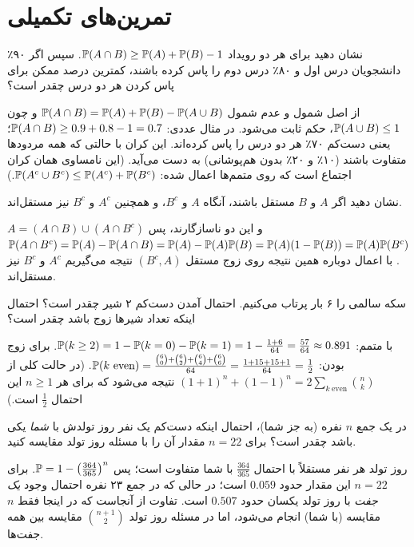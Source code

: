 \section{تمرین‌های تکمیلی}

\begin{exercise}
نشان دهید برای هر دو رویداد $\mathbb{P}(A\cap B)\ge\mathbb{P}(A)+\mathbb{P}(B)-1$. سپس اگر ۹۰٪ دانشجویان درس اول و ۸۰٪ درس دوم را پاس کرده باشند، کمترین درصد ممکن برای پاس کردن هر دو درس چقدر است؟
\end{exercise}
\begin{solution}
از اصل شمول و عدم شمول $\mathbb{P}(A\cap B)=\mathbb{P}(A)+\mathbb{P}(B)-\mathbb{P}(A\cup B)$ و چون $\mathbb{P}(A\cup B)\le1$، حکم ثابت می‌شود. در مثال عددی: $\mathbb{P}(A\cap B)\ge0.9+0.8-1=0.7$؛ یعنی دست‌کم ۷۰٪ هر دو درس را پاس کرده‌اند. این کران با حالتی که همه مردودها متفاوت باشند (۱۰٪ و ۲۰٪ بدون هم‌پوشانی) به دست می‌آید. (این نامساوی همان کران اجتماع است که روی متمم‌ها اعمال شده: $\mathbb{P}(A^c\cup B^c)\le\mathbb{P}(A^c)+\mathbb{P}(B^c)$.)
\end{solution}

\begin{exercise}\label{ex:indep-comp}
نشان دهید اگر $A$ و $B$ مستقل باشند، آنگاه $A$ و $B^c$، و همچنین $A^c$ و $B^c$ نیز مستقل‌اند.
\end{exercise}
\begin{solution}
$A=(A\cap B)\cup(A\cap B^c)$ و این دو ناسازگارند، پس
$\mathbb{P}(A\cap B^c)=\mathbb{P}(A)-\mathbb{P}(A\cap B)=\mathbb{P}(A)-\mathbb{P}(A)\mathbb{P}(B)=\mathbb{P}(A)(1-\mathbb{P}(B))=\mathbb{P}(A)\mathbb{P}(B^c)$.
با اعمال دوباره همین نتیجه روی زوج مستقل $(B^c,A)$ نتیجه می‌گیریم $A^c$ و $B^c$ نیز مستقل‌اند.
\end{solution}

\begin{exercise}
سکه سالمی را ۶ بار پرتاب می‌کنیم. احتمال آمدن دست‌کم ۲ شیر چقدر است؟ احتمال اینکه تعداد شیرها زوج باشد چقدر است؟
\end{exercise}
\begin{solution}
با متمم: $\mathbb{P}(k\ge2)=1-\mathbb{P}(k=0)-\mathbb{P}(k=1)=1-\frac{1+6}{64}=\frac{57}{64}\approx0.891$.
برای زوج بودن: $\Prob(k\ \text{even})=\frac{\binom60+\binom62+\binom64+\binom66}{64}=\frac{1+15+15+1}{64}=\frac12$. (در حالت کلی از $(1+1)^n+(1-1)^n=2\sum_{k\ \text{even}}\binom nk$ نتیجه می‌شود که برای هر $n\ge1$ این احتمال $\frac12$ است.)
\end{solution}

\begin{exercise}
در یک جمع $n$ نفره (به جز شما)، احتمال اینکه دست‌کم یک نفر روز تولدش با \emph{شما} یکی باشد چقدر است؟ برای $n=22$ مقدار آن را با مسئله روز تولد مقایسه کنید.
\end{exercise}
\begin{solution}
روز تولد هر نفر مستقلاً با احتمال $\frac{364}{365}$ با شما متفاوت است؛ پس
$\mathbb{P}=1-\big(\frac{364}{365}\big)^n$.
برای $n=22$ این مقدار حدود $0.059$ است؛ در حالی که در جمع ۲۳ نفره احتمال وجود \emph{یک جفت} با روز تولد یکسان حدود $0.507$ است. تفاوت از آنجاست که در اینجا فقط $n$ مقایسه (با شما) انجام می‌شود، اما در مسئله روز تولد $\binom{n+1}{2}$ مقایسه بین همه جفت‌ها.
\end{solution}

